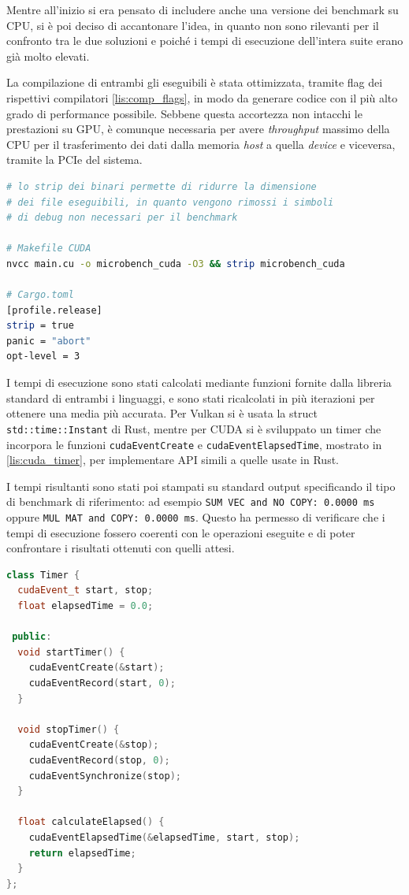 Mentre all'inizio si era pensato di includere anche una versione dei benchmark su \gls{CPU}, si è poi deciso di accantonare l'idea, in quanto non sono rilevanti per il confronto tra le due soluzioni e poiché i tempi di esecuzione dell'intera suite erano già molto elevati.

La compilazione di entrambi gli eseguibili è stata ottimizzata, tramite flag dei rispettivi compilatori \ref{lis:comp_flags}, in modo da generare codice con il più alto grado di performance possibile. Sebbene questa accortezza non intacchi le prestazioni su \gls{GPU}, è comunque necessaria per avere \textit{throughput} massimo della \gls{CPU} per il trasferimento dei dati dalla memoria \textit{host} a quella \textit{device} e viceversa, tramite la \gls{PCIe} del sistema.

\vspace{5mm}
\begin{lstlisting}[language=bash, caption=Flag di compilazione CUDA e Rust, label=lis:comp_flags]
# lo strip dei binari permette di ridurre la dimensione
# dei file eseguibili, in quanto vengono rimossi i simboli
# di debug non necessari per il benchmark

# Makefile CUDA
nvcc main.cu -o microbench_cuda -O3 && strip microbench_cuda

# Cargo.toml
[profile.release]
strip = true
panic = "abort"
opt-level = 3
\end{lstlisting}
\vspace{5mm}

I tempi di esecuzione sono stati calcolati mediante funzioni fornite dalla libreria standard di entrambi i linguaggi, e sono stati ricalcolati in più iterazioni per ottenere una media più accurata. Per Vulkan si è usata la struct \verb|std::time::Instant| di Rust, mentre per \gls{CUDA} si è sviluppato un timer che incorpora le funzioni \verb|cudaEventCreate| e \verb|cudaEventElapsedTime|, mostrato in \ref{lis:cuda_timer}, per implementare \gls{API} simili a quelle usate in Rust.

I tempi risultanti sono stati poi stampati su standard output specificando il tipo di benchmark di riferimento: ad esempio \verb|SUM VEC and NO COPY: 0.0000 ms| oppure \verb|MUL MAT and COPY: 0.0000 ms|. Questo ha permesso di verificare che i tempi di esecuzione fossero coerenti con le operazioni eseguite e di poter confrontare i risultati ottenuti con quelli attesi.

\vspace{5mm}
\begin{lstlisting}[language=C++, caption=Timer CUDA, label=lis:cuda_timer]
class Timer {
  cudaEvent_t start, stop;
  float elapsedTime = 0.0;

 public:
  void startTimer() {
    cudaEventCreate(&start);
    cudaEventRecord(start, 0);
  }

  void stopTimer() {
    cudaEventCreate(&stop);
    cudaEventRecord(stop, 0);
    cudaEventSynchronize(stop);
  }

  float calculateElapsed() {
    cudaEventElapsedTime(&elapsedTime, start, stop);
    return elapsedTime;
  }
};
\end{lstlisting}
\vspace{5mm}

